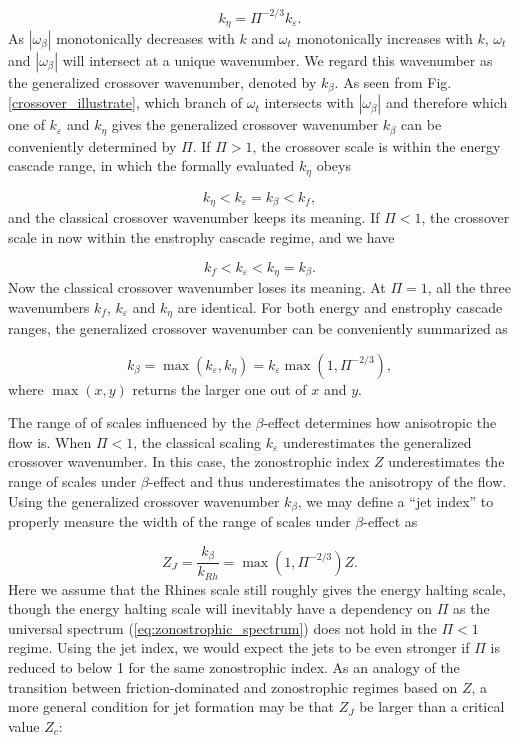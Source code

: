 \documentclass{ametsoc}
\begin{document}
\begin{equation}
k_{\eta}=\Pi^{-2/3}k_{\varepsilon}.\label{eq:k_eta_k_epsilon_relation}
\end{equation}
As $|\omega_{\beta}|$ monotonically decreases with $k$ and $\omega_{t}$
monotonically increases with $k$, $\omega_{t}$ and $|\omega_{\beta}|$
will intersect at a unique wavenumber. We regard this wavenumber as
the generalized crossover wavenumber, denoted by $k_{\beta}$. As
seen from Fig. \ref{crossover_illustrate}, which branch of $\omega_{t}$
intersects with $|\omega_{\beta}|$ and therefore which one of $k_{\varepsilon}$
and $k_{\eta}$ gives the generalized crossover wavenumber $k_{\beta}$
can be conveniently determined by $\Pi$. If $\Pi>1$, the crossover
scale is within the energy cascade range, in which the formally evaluated
$k_{\eta}$ obeys

\[
k_{\eta}<k_{\varepsilon}=k_{\beta}<k_{f},
\]
and the classical crossover wavenumber keeps its meaning. If $\Pi<1$,
the crossover scale in now within the enstrophy cascade regime, and
we have

\[
k_{f}<k_{\varepsilon}<k_{\eta}=k_{\beta}.
\]
Now the classical crossover wavenumber loses its meaning. At $\Pi=1$,
all the three wavenumbers $k_{f}$, $k_{\varepsilon}$ and $k_{\eta}$
are identical. For both energy and enstrophy cascade ranges, the
generalized crossover wavenumber can be conveniently summarized as

\begin{equation}
k_{\beta}=\max(k_{\varepsilon},k_{\eta})=k_{\varepsilon}\max(1,\Pi^{-2/3}),\label{eq:generalized_crossover_wavenumber}
\end{equation}
where $\max(x,y)$ returns the larger one out of $x$ and $y$. 

The range of of scales influenced by the $\beta$-effect determines
how anisotropic the flow is. When $\Pi<1$, the classical scaling
$k_{\varepsilon}$ underestimates the generalized crossover wavenumber.
In this case, the zonostrophic index $Z$ underestimates the range
of scales under $\beta$-effect and thus underestimates the anisotropy
of the flow. Using the generalized crossover wavenumber $k_{\beta}$,
we may define a ``jet index'' to properly measure the width of the
range of scales under $\beta$-effect as

\begin{equation}
Z_{J}=\frac{k_{\beta}}{k_{Rh}}=\max(1,\Pi^{-2/3})Z.\label{eq:jet index}
\end{equation}
Here we assume that the Rhines scale still roughly gives the energy
halting scale, though the energy halting scale will inevitably have a
dependency on $\Pi$ as the universal spectrum (\ref{eq:zonostrophic_spectrum})
does not hold in the $\Pi<1$ regime. Using the jet index, we would
expect the jets to be even stronger if $\Pi$ is reduced to below 1 for
the same zonostrophic index. As an analogy of the transition between
friction-dominated and zonostrophic regimes based on $Z$, a more
general condition for jet formation may be that $Z_{J}$ be larger than a
critical value $Z_{c}$:
\end{document}
